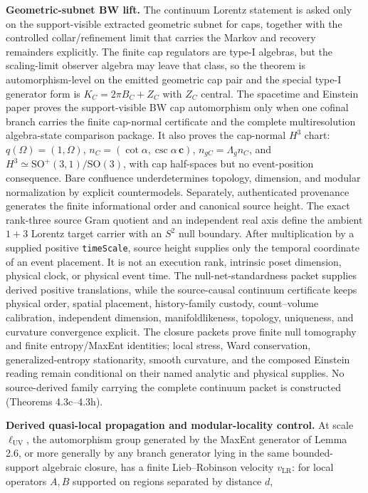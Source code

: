 \textbf{Geometric-subnet BW lift.} The continuum Lorentz statement is asked only on the support-visible extracted geometric subnet for caps, together with the controlled collar/refinement limit that carries the Markov and recovery remainders explicitly. The finite cap regulators are type-I algebras, but the scaling-limit observer algebra may leave that class, so the theorem is automorphism-level on the emitted geometric cap pair and the special type-I generator form is \(K_C=2\pi B_C+Z_C\) with \(Z_C\) central. The spacetime and Einstein paper proves the support-visible BW cap automorphism only when one cofinal branch carries the finite cap-normal certificate and the complete multiresolution algebra-state comparison package. It also proves the cap-normal \(H^3\) chart: \(q(\Omega)=(1,\Omega)\), \(n_C=(\cot\alpha,\csc\alpha\,\mathbf c)\), \(n_{gC}=\Lambda_gn_C\), and \(H^3\simeq\mathrm{SO}^+(3,1)/\mathrm{SO}(3)\), with cap half-spaces but no event-position consequence. Bare confluence underdetermines topology, dimension, and modular normalization by explicit countermodels. Separately, authenticated provenance generates the finite informational order and canonical source height. The exact rank-three source Gram quotient and an independent real axis define the ambient \(1+3\) Lorentz target carrier with an \(S^2\) null boundary. After multiplication by a supplied positive \texttt{timeScale}, source height supplies only the temporal coordinate of an event placement. It is not an execution rank, intrinsic poset dimension, physical clock, or physical event time. The null-net-standardness packet supplies derived positive translations, while the source-causal continuum certificate keeps physical order, spatial placement, history-family custody, count--volume calibration, independent dimension, manifoldlikeness, topology, uniqueness, and curvature convergence explicit. The closure packets prove finite null tomography and finite entropy/MaxEnt identities; local stress, Ward conservation, generalized-entropy stationarity, smooth curvature, and the composed Einstein reading remain conditional on their named analytic and physical supplies. No source-derived family carrying the complete continuum packet is constructed (Theorems 4.3c--4.3h).

\textbf{Derived quasi-local propagation and modular-locality control.} At scale \(\ell_{\mathrm{UV}}\), the automorphism group generated by the MaxEnt generator of Lemma 2.6, or more generally by any branch generator lying in the same bounded-support algebraic closure, has a finite Lieb--Robinson velocity \(v_{\mathrm{LR}}\): for local operators \(A, B\) supported on regions separated by distance \(d\),

